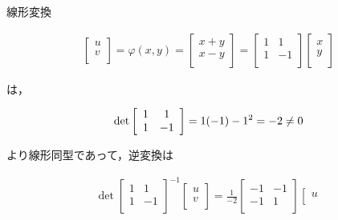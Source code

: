 \documentclass[a4paper,10pt]{jarticle}
\begin{document}
\begin{enumerate}
線形変換
\begin{fleqn}[30pt] \begin{gather*}
 	\left[ \begin{array}{r}
		u \\
		v \\
	\end{array}  \right]
	= \varphi(x,y)=
 	\left[ \begin{array}{r}
		x+y \\
		x-y \\
	\end{array}  \right]
	=
 	\left[ \begin{array}{cc}
		1 & 1 \\
		1 & -1 \\
	\end{array}  \right]
 	\left[ \begin{array}{r}
		x \\
		y \\
	\end{array}  \right]
\end{gather*} \end{fleqn}
は，
\begin{fleqn}[30pt] \begin{gather*}
	\rm{det}
 	\left[ \begin{array}{cc}
		1 & 1 \\
		1 & -1 \\
	\end{array}  \right]
	=1(-1)-1^2=-2 \ne 0
\end{gather*} \end{fleqn}
より線形同型であって，逆変換は
\begin{fleqn}[30pt] \begin{gather*}
	\det
 	\left[ \begin{array}{cc}
		1 & 1 \\
		1 & -1 \\
	\end{array}  \right]^{-1}
 	\left[ \begin{array}{r}
		u \\
		v \\
	\end{array}  \right]
	=\frac{1}{-2}
 	\left[ \begin{array}{cc}
		-1 & -1 \\
		-1 & 1 \\
	\end{array}  \right]
 	\left[ \begin{array}{r}
		u \\

\end{array}
\end{gather*}
\end{fleqn}
\end{enumerate}
\end{document}
